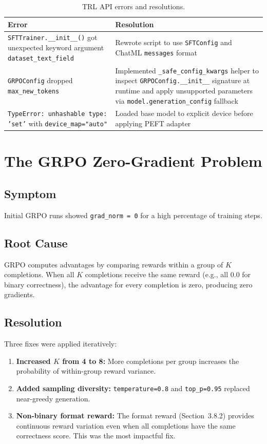 \documentclass[12pt]{report}
\begin{document}
\begin{table}[H]
\centering
\caption{TRL API errors and resolutions.}
\label{tab:trl_errors}
\begin{tabular}{p{4cm}p{7cm}}
\toprule
\textbf{Error} & \textbf{Resolution} \\
\midrule
\texttt{SFTTrainer.\_\_init\_\_()} got unexpected keyword argument \texttt{dataset\_text\_field} & Rewrote script to use \texttt{SFTConfig} and ChatML \texttt{messages} format \\
\addlinespace
\texttt{GRPOConfig} dropped \texttt{max\_new\_tokens} & Implemented \texttt{\_safe\_config\_kwargs} helper to inspect \texttt{GRPOConfig.\_\_init\_\_} signature at runtime and apply unsupported parameters via \texttt{model.generation\_config} fallback \\
\addlinespace
\texttt{TypeError: unhashable type: 'set'} with \texttt{device\_map="auto"} & Loaded base model to explicit device before applying PEFT adapter \\
\bottomrule
\end{tabular}
\end{table}

\section{The GRPO Zero-Gradient Problem}

\subsection{Symptom}

Initial GRPO runs showed \texttt{grad\_norm = 0} for a high percentage of training steps.

\subsection{Root Cause}

GRPO computes advantages by comparing rewards within a group of $K$ completions. When all $K$ completions receive the same reward (e.g., all 0.0 for binary correctness), the advantage for every completion is zero, producing zero gradients.

\subsection{Resolution}

Three fixes were applied iteratively:
\begin{enumerate}
    \item \textbf{Increased $K$ from 4 to 8:} More completions per group increases the probability of within-group reward variance.
    \item \textbf{Added sampling diversity:} \texttt{temperature=0.8} and \texttt{top\_p=0.95} replaced near-greedy generation.
    \item \textbf{Non-binary format reward:} The format reward (Section~3.8.2) provides continuous reward variation even when all completions have the same correctness score. This was the most impactful fix.
\end{enumerate}
\end{document}
